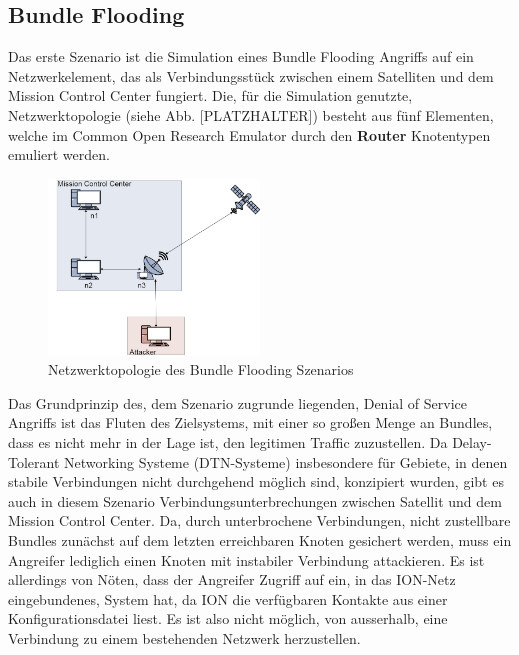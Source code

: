 \documentclass{article}
\begin{document}
\subsection{Bundle Flooding}
Das erste Szenario ist die Simulation eines Bundle Flooding Angriffs auf ein Netzwerkelement, das als Verbindungsstück zwischen einem Satelliten und dem Mission Control Center fungiert. Die, für die Simulation genutzte, Netzwerktopologie (siehe Abb. [PLATZHALTER]) besteht aus fünf Elementen, welche im Common Open Research Emulator durch den \textbf{Router} Knotentypen emuliert werden.\par
\begin{figure}[h]
\centering
\includegraphics[width=0.5\textwidth]{flooding}
\caption{Netzwerktopologie des Bundle Flooding Szenarios}
\end{figure}
Das Grundprinzip des, dem Szenario zugrunde liegenden, Denial of Service Angriffs ist das Fluten des Zielsystems, mit einer so großen Menge an Bundles, dass es nicht mehr in der Lage ist, den legitimen Traffic zuzustellen. Da Delay-Tolerant Networking Systeme (DTN-Systeme) insbesondere für Gebiete, in denen stabile Verbindungen nicht durchgehend möglich sind, konzipiert wurden, gibt es auch in diesem Szenario Verbindungsunterbrechungen zwischen Satellit und dem Mission Control Center. Da, durch unterbrochene Verbindungen, nicht zustellbare Bundles zunächst auf dem letzten erreichbaren Knoten gesichert werden, muss ein Angreifer lediglich einen Knoten mit instabiler Verbindung attackieren. Es ist allerdings von Nöten, dass der Angreifer Zugriff auf ein, in das ION-Netz eingebundenes, System hat, da ION die verfügbaren Kontakte aus einer Konfigurationsdatei liest. Es ist also nicht möglich, von ausserhalb, eine Verbindung zu einem bestehenden Netzwerk herzustellen.\par
\end{document}
